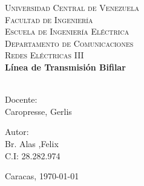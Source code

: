 \begin{titlepage}
    \begin{center}
        \textsc{ Universidad Central de Venezuela}\\
        \textsc{ Facultad de Ingeniería}\\
        \textsc{ Escuela de Ingeniería Eléctrica}\\
        \textsc{ Departamento de Comunicaciones}\\
        \textsc{Redes Eléctricas III}\\[7cm]

        
        {\Large \bfseries Línea de Transmisión Bifilar}\\[0.2cm]
        {\Large \ }\\[9cm]
        
        \begin{minipage}{0.4\textwidth}
            \begin{flushleft}
                {Docente:}\\
                Caropresse, Gerlis 
            \end{flushleft}
        \end{minipage}
        \begin{minipage}{0.4\textwidth}
            \begin{flushright}
                {Autor:}\\
                Br. Alas ,Felix \\
                C.I: 28.282.974
            \end{flushright}
        \end{minipage}
        
        \vfill
        
        { Caracas, \today} %
        
    \end{center}
\end{titlepage}